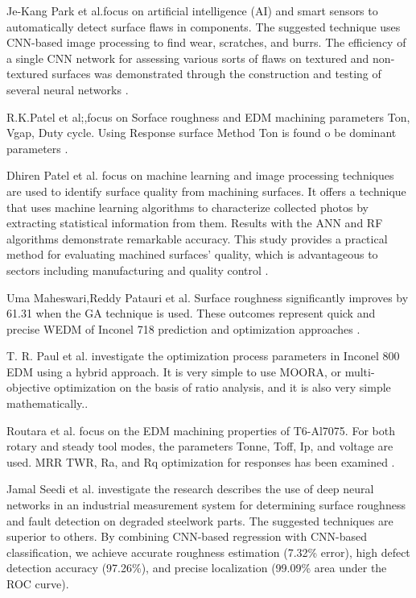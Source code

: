 \documentclass[suppldata]{interact}
\begin{document}
 Je-Kang Park et al.focus on artificial intelligence (AI) and smart sensors to automatically detect surface flaws in components. The suggested technique uses CNN-based image processing to find wear, scratches, and burrs. The efficiency of a single CNN network for assessing various sorts of flaws on textured and non-textured surfaces was demonstrated through the construction and testing of several neural networks \textbf{\cite{park2016machine}}.

 R.K.Patel et al;,focus on  Sorface roughness and EDM machining parameters Ton, Vgap, Duty cycle. Using Response surface Method  Ton is found o be dominant parameters\textbf{\cite{patel2009determination}} .

 Dhiren Patel et al. focus on  machine learning and image processing techniques are used to identify surface quality from machining surfaces. It offers a technique that uses machine learning algorithms to characterize collected photos by extracting statistical information from them. Results with the ANN and RF algorithms demonstrate remarkable accuracy. This study provides a practical method for evaluating machined surfaces' quality, which is advantageous to sectors including manufacturing and quality control \textbf{\cite{patel2019texture}}.

 Uma Maheswari,Reddy Patauri et al. Surface roughness significantly improves by 61.31 when the GA technique is used. These outcomes represent quick and precise WEDM of Inconel 718 prediction and optimization approaches \textbf{\cite{paturi2021machine}}.

 T. R. Paul et al. investigate the optimization process parameters in Inconel 800 EDM using a hybrid approach. It is very simple to use MOORA, or multi-objective optimization on the basis of ratio analysis, and it is also very simple mathematically.\textbf{\cite{paul2019multi}}.

 Routara et al. focus on the EDM machining properties of T6-Al7075. For both rotary and steady tool modes, the parameters Tonne, Toff, Ip, and voltage are used. MRR TWR, Ra, and Rq optimization for responses has been examined \textbf{\cite{routara2020investigation}}.

Jamal Seedi et al. investigate the research describes the use of deep neural networks in an industrial measurement system for determining surface roughness and fault detection on degraded steelwork parts. The suggested techniques are superior to others.  By combining CNN-based regression with CNN-based classification, we achieve accurate roughness estimation (7.32\% error), high defect detection accuracy (97.26\%), and precise localization (99.09\% area under the ROC curve)\textbf{\cite{saeedi2021measurement}}.  
\end{document}
